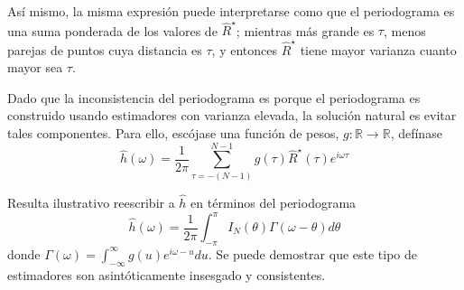 \documentclass[12pt,letterpaper,draft]{book}
\newcommand{\R}{\mathbb{R}}
\newcommand{\intR}{\int_{-\infty}^{\infty}}
\newcommand{\intPI}{\int_{-\pi}^{\pi}}
\begin{document}
Así mismo, la misma expresión puede interpretarse como que el periodograma es una suma ponderada de 
los valores de $\widehat{R}^{\star}$; mientras más grande es $\tau$, menos parejas de puntos cuya 
distancia es $\tau$, y entonces $\widehat{R}^{\star}$ tiene mayor varianza cuanto mayor sea $\tau$. 

Dado que la inconsistencia del periodograma es porque el periodograma es construido usando 
estimadores con varianza elevada, la solución natural es evitar tales componentes. Para ello, 
escójase una función de pesos, $g: \R \rightarrow \R$, defínase
%
\begin{equation}
\widehat{h}(\omega) = \frac{1}{2 \pi} \sum_{\tau = -(N-1)}^{N-1} g(\tau) \widehat{R}^{\star}(\tau) 
e^{i \omega \tau} 
\label{txt_estimador}
\end{equation}

Resulta ilustrativo reescribir a $\widehat{h}$ en términos del periodograma
\begin{equation*}
\widehat{h}(\omega) = \frac{1}{2 \pi} \intPI I_N(\theta) \Gamma(\omega - \theta) d\theta
\end{equation*}
donde $\Gamma(\omega) = \intR g(u) e^{i \omega -u } du$.
%
Se puede demostrar que este tipo de estimadores son asintóticamente insesgado y consistentes.
\end{document}
